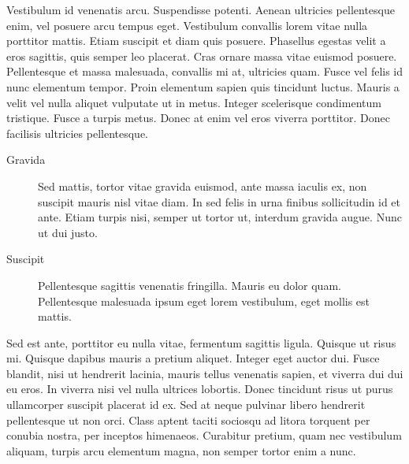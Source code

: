 \documentclass[polish,engineering]{wizthesis}
\begin{document}
Vestibulum id venenatis arcu. Suspendisse potenti. Aenean ultricies pellentesque enim, vel posuere arcu tempus eget. Vestibulum convallis lorem vitae nulla porttitor mattis. Etiam suscipit et diam quis posuere. Phasellus egestas velit a eros sagittis, quis semper leo placerat.
Cras ornare massa vitae euismod posuere. Pellentesque et massa malesuada, convallis mi at, ultricies quam. Fusce vel felis id nunc elementum tempor. Proin elementum sapien quis tincidunt luctus. Mauris a velit vel nulla aliquet vulputate ut in metus. Integer scelerisque condimentum tristique. Fusce a turpis metus. Donec at enim vel eros viverra porttitor. Donec facilisis ultricies pellentesque.
\begin{description}
  \item[Gravida] Sed mattis, tortor vitae gravida euismod, ante massa iaculis ex, non suscipit mauris nisl vitae diam. In sed felis in urna finibus sollicitudin id et ante. Etiam turpis nisi, semper ut tortor ut, interdum gravida augue. Nunc ut dui justo.
  \item[Suscipit] Pellentesque sagittis venenatis fringilla. Mauris eu dolor quam. Pellentesque malesuada ipsum eget lorem vestibulum, eget mollis est mattis.
\end{description}
Sed est ante, porttitor eu nulla vitae, fermentum sagittis ligula. Quisque ut risus mi. Quisque dapibus mauris a pretium aliquet. Integer eget auctor dui. Fusce blandit, nisi ut hendrerit lacinia, mauris tellus venenatis sapien, et viverra dui dui eu eros. In viverra nisi vel nulla ultrices lobortis. Donec tincidunt risus ut purus ullamcorper suscipit placerat id ex.
Sed at neque pulvinar libero hendrerit pellentesque ut non orci. Class aptent taciti sociosqu ad litora torquent per conubia nostra, per inceptos himenaeos. Curabitur pretium, quam nec vestibulum aliquam, turpis arcu elementum magna, non semper tortor enim a nunc.
\end{document}
